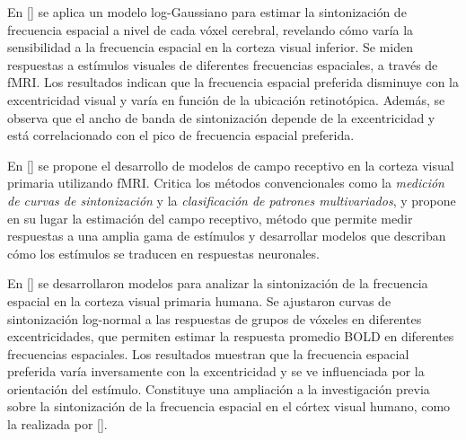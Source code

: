 En [\cite{aghajari_population_2020}] se aplica un modelo log-Gaussiano para estimar la sintonización de frecuencia espacial a nivel de cada vóxel cerebral, revelando cómo varía la sensibilidad a la frecuencia espacial en la corteza visual inferior. Se miden respuestas a estímulos visuales de diferentes frecuencias espaciales, a trav\'es de fMRI. Los resultados indican que la frecuencia espacial preferida disminuye con la excentricidad visual y varía en función de la ubicación retinotópica. Además, se observa que el ancho de banda de sintonización depende de la excentricidad y está correlacionado con el pico de frecuencia espacial preferida.

En [\cite{kriegeskorte_understanding_2011}] se propone el desarrollo de modelos de campo receptivo en la corteza visual primaria utilizando fMRI. Critica los métodos convencionales como la \textit{medición de curvas de sintonización} y la \textit{clasificación de patrones multivariados}, y propone en su lugar la estimación del campo receptivo, método que permite medir respuestas a una amplia gama de estímulos y desarrollar modelos que describan cómo los estímulos se traducen en respuestas neuronales.

En [\cite{broderick_mapping_2022}] se desarrollaron modelos para analizar la sintonización de la frecuencia espacial en la corteza visual primaria humana. Se ajustaron curvas de sintonización log-normal a las respuestas de grupos de vóxeles en diferentes excentricidades, que permiten estimar la respuesta promedio BOLD en diferentes frecuencias espaciales. Los resultados muestran que la frecuencia espacial preferida varía inversamente con la excentricidad y se ve influenciada por la orientación del estímulo. Constituye una ampliaci\'on a la investigación previa sobre la sintonización de la frecuencia espacial en el córtex visual humano, como la realizada por [\cite{aghajari_population_2020}]. 






